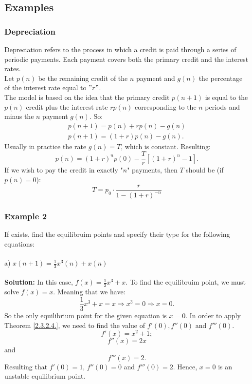 \documentclass[a4paper,11pt]{report}
\begin{document}
\subsection{Examples}

\subsubsection{Depreciation}

Depreciation refers to the process in which a credit is paid through a series of periodic payments. Each payment covers both the primary credit and the interest rates.\\
Let $p(n)$ be the remaining credit of the $n$ payment and $g(n)$ the percentage of the interest rate equal to $"r"$. \\
The model is based on the idea that the primary credit $p(n+1)$ is equal to the $p(n)$ credit plus the interest rate $rp(n)$ corresponding to the $n$ periods and minus the $n$ payment $g(n)$. So:
\begin{align*}
 p(n+1)=p(n)+rp(n)-g(n)\\
 p(n+1)=(1+r)p(n)-g(n).
\end{align*}
Usually in practice the rate $g(n)=T$, which is constant. Resulting:
\begin{equation}
 p(n)=(1+r)^{n}p(0)-\frac{T}{r}[(1+r)^{n}-1].
\end{equation}
If we wish to pay the credit in exactly "$n$" payments, then $T$ should be (if $p(n)=0$):
$$T=p_{0}\cdot\frac{r}{1-(1+r)^{-n}}$$ 

\subsubsection{Example 2} If exists, find the equilibruim points and specify their type for the following equations:\\ \\
a) $x(n+1)=\frac{1}{3}x^{3}(n)+x(n)$\\ \\
\textbf{Solution:}
In this case, $f(x)=\frac{1}{3}x^{3}+x$. To find the equilibruim point, we must solve $f(x)=x$. Meaning that we have:
$$\frac{1}{3} x^{3}+x=x \Rightarrow x^{3}=0 \Rightarrow x=0.$$
So the only equilibrium point for the given equation is $x=0$. In order to apply Theorem \ref{2.3.2.4.}, we need to find the value of $f'(0), f''(0)$ and $f'''(0).$ 
$$f'(x)=x^{2}+1;$$
$$f''(x)=2x$$ and
$$f'''(x)=2.$$
Resulting that $f'(0)=1$, $f''(0)=0$ and $f'''(0)=2$. Hence, $x=0$ is an unstable equilibrium point.\\
\end{document}
